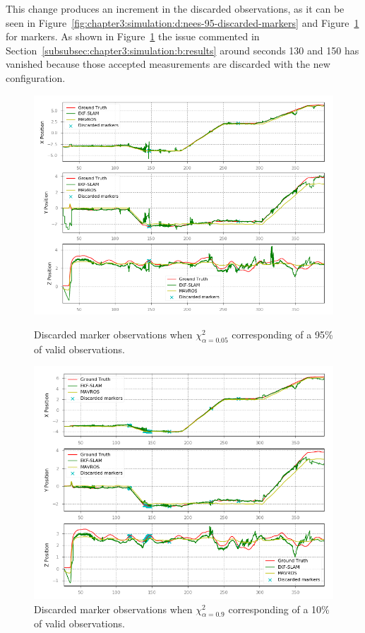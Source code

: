 This change produces an increment in the discarded observations, as it can be seen in Figure~\ref{fig:chapter3:simulation:d:nees-95-discarded-markers} and Figure~\ref{fig:chapter3:simulation:d:nees-10-discarded-markers} for markers. As shown in Figure~\ref{fig:chapter3:simulation:d:nees-10-discarded-markers} the issue commented in Section~\ref{subsubsec:chapter3:simulation:b:results} around seconds 130 and 150 has vanished because those accepted measurements are discarded with the new configuration.\\
\begin{figure}
    \centering
    \includegraphics[width=\textwidth]{Images/fig24-nees-95-path-discarded-markers.png}
    \caption[Discarded marker observations when $\chi_{\alpha=0.05}^2$]{Discarded marker observations when $\chi_{\alpha=0.05}^2$ corresponding of a 95\% of valid observations.}
    \label{fig:chapter3:simulation:d:nees-95-discarded-markers}
    \centering
    \includegraphics[width=\textwidth]{Images/fig24-nees-10-path-discarded-markers.png}
    \caption[Discarded marker observations when $\chi_{\alpha=0.9}^2$]{Discarded marker observations when $\chi_{\alpha=0.9}^2$ corresponding of a 10\% of valid observations.}
    \label{fig:chapter3:simulation:d:nees-10-discarded-markers}
\end{figure}

